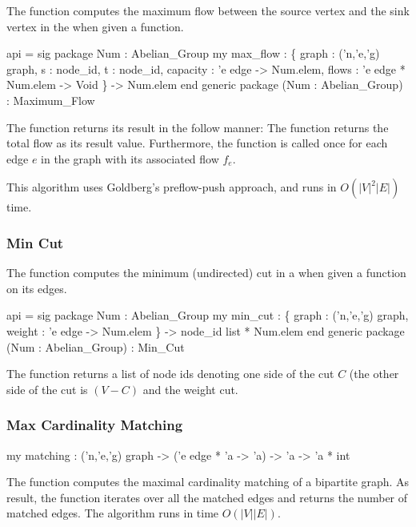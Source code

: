    The function  computes the
maximum flow between the source vertex  and the sink vertex
 in the  when given a  function. 
\begin{SML}
 api  = sig
   package Num : Abelian_Group
   my max_flow : \{ graph    : ('n,'e,'g) graph,
                    s        : node_id, 
                    t        : node_id, 
                    capacity : 'e edge -> Num.elem, 
                    flows    : 'e edge * Num.elem -> Void
                  \} -> Num.elem
 end
 generic package (Num : Abelian_Group) : Maximum_Flow
\end{SML}
The function  returns its result in the follow manner:
The function returns the total flow as its result value.
Furthermore, the function  is called once for each edge $e$ in the
graph with its associated flow $f_e$.  

This algorithm uses Goldberg's preflow-push approach, and runs
in $O(|V|^2|E|)$ time.
\subsubsection{Min Cut}
   The function  computes the
minimum (undirected) cut in a  
when given a  function on
its edges.  
\begin{SML}
 api  = sig
   package Num : Abelian_Group
   my min_cut : \{ graph    : ('n,'e,'g) graph,
                   weight : 'e edge -> Num.elem
                 \} -> node_id list * Num.elem
 end
 generic package (Num : Abelian_Group) : Min_Cut
\end{SML}
The function  returns a list of node ids denoting
one side of the cut $C$ (the other side of the cut is $(V - C)$ and
the weight cut.

\subsubsection{Max Cardinality Matching}

\begin{SML}
   my matching : ('n,'e,'g) graph -> ('e edge * 'a -> 'a) -> 'a -> 'a * int
\end{SML}

The function  computes the
maximal cardinality matching of a bipartite graph.  As result, 
the function iterates over all the matched edges and returns the
number of matched edges.  The algorithm runs in time $O(|V||E|)$.

